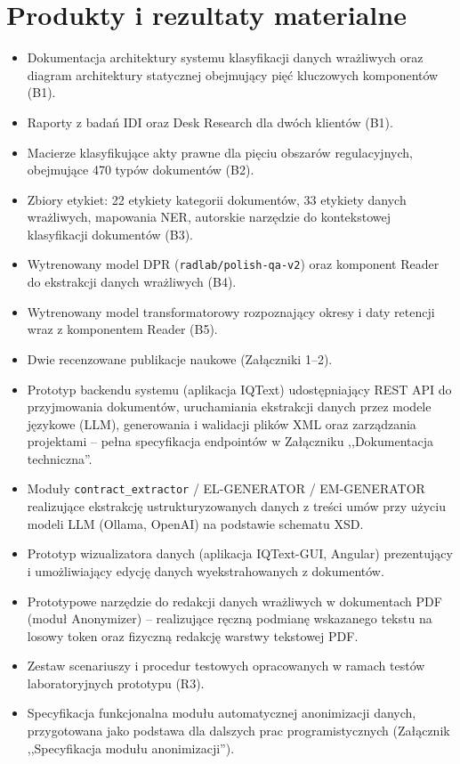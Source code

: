 \documentclass[12pt,a4paper]{report}
\begin{document}
\section{Produkty i rezultaty materialne}
\begin{itemize}
    \item Dokumentacja architektury systemu klasyfikacji danych wrażliwych oraz diagram architektury statycznej obejmujący pięć kluczowych komponentów (B1).
    \item Raporty z badań IDI oraz Desk Research dla dwóch klientów (B1).
    \item Macierze klasyfikujące akty prawne dla pięciu obszarów regulacyjnych, obejmujące 470 typów dokumentów (B2).
    \item Zbiory etykiet: 22 etykiety kategorii dokumentów, 33 etykiety danych wrażliwych, mapowania NER, autorskie narzędzie do kontekstowej klasyfikacji dokumentów (B3).
    \item Wytrenowany model DPR (\texttt{radlab/polish-qa-v2}) oraz komponent Reader do ekstrakcji danych wrażliwych (B4).
    \item Wytrenowany model transformatorowy rozpoznający okresy i daty retencji wraz z komponentem Reader (B5).
    \item Dwie recenzowane publikacje naukowe (Załączniki 1--2).
    \item Prototyp backendu systemu (aplikacja IQText) udostępniający REST API do przyjmowania dokumentów, uruchamiania ekstrakcji danych przez modele językowe (LLM), generowania i walidacji plików XML oraz zarządzania projektami -- pełna specyfikacja endpointów w Załączniku ,,Dokumentacja techniczna''.
    \item Moduły \texttt{contract\_extractor} / EL-GENERATOR / EM-GENERATOR realizujące ekstrakcję ustrukturyzowanych danych z treści umów przy użyciu modeli LLM (Ollama, OpenAI) na podstawie schematu XSD.
    \item Prototyp wizualizatora danych (aplikacja IQText-GUI, Angular) prezentujący i umożliwiający edycję danych wyekstrahowanych z dokumentów.
    \item Prototypowe narzędzie do redakcji danych wrażliwych w dokumentach PDF (moduł Anonymizer) -- realizujące ręczną podmianę wskazanego tekstu na losowy token oraz fizyczną redakcję warstwy tekstowej PDF.
    \item Zestaw scenariuszy i procedur testowych opracowanych w ramach testów laboratoryjnych prototypu (R3).
    \item Specyfikacja funkcjonalna modułu automatycznej anonimizacji danych, przygotowana jako podstawa dla dalszych prac programistycznych (Załącznik ,,Specyfikacja modułu anonimizacji'').
\end{itemize}
\end{document}
